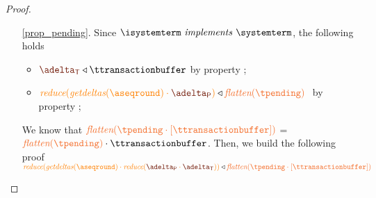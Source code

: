 \begin{proof}
\begin{itemize}
\begin{itemize}
\begin{enumerate}
\begin{itemize}
						 The proof is completed by noting that $\anupdseq[_1]\cdot(\anupdseq[_2]\cdot \ttransactionbuffer) = \flatten{{\tsent}\cdot[\ttransactionbuffer]}$.
						 \medskip
						 

						\item $\cid\notin\dom\inserver$: 
						 Since $\implements{\isystemterm}{\systemterm}$, 
						 $\pushbuffer \triangleleft \ \flatten{\tsent}$ () 
						 and  $\transactionbuffer \triangleleft{\ttransactionbuffer}$ (). 
						 Then, we build the following proof 
						\[\ireduce{\pushbuffer\cdot \transactionbuffer} \triangleleft \ \flatten{{\tsent}\cdot[\ttransactionbuffer]}\]
						\[
						  \mathrulean{\lemref{lemma:reduce}}
						  {
						  \igetdeltas{\inserver(\cid)} \triangleleft \ \anupdseq[_1] 
						  \quad
						 \transactionbuffer \triangleleft \ttransactionbuffer}
  						 {\ireduce{\pushbuffer\cdot \transactionbuffer} \triangleleft \ \anupdseq[_1]\cdot\ttransactionbuffer}
						\]
						
						The proof is completed by noting that $\anupdseq[_1] = \flatten{{\tsent}}$.

						\end{itemize}
						
						
						
						
						\item[\ref{prop_pending}.] 	Since 
						$\implements{\isystemterm}{\systemterm}$, the following holds
						\begin{itemize}
							\item $\transactionbuffer \triangleleft{\ttransactionbuffer}$ by property ;  
							\item $\ireduce{\igetdeltas{\pending}\cdot{\pushbuffer}}\triangleleft \flatten{\tpending} \ $ by property ;
						\end{itemize}
						We know that $\flatten{\tpending\cdot [\ttransactionbuffer]}$ = $\flatten{\tpending} \cdot \ttransactionbuffer$.
						 Then, we  build the following proof 
						$\ireduce{\igetdeltas{\pending}\cdot\ireduce{{\pushbuffer}\cdot \transactionbuffer}}\triangleleft \flatten{\tpending\cdot [\ttransactionbuffer]}$
						 


\end{enumerate}
\end{itemize}
\end{itemize}
\end{proof}
